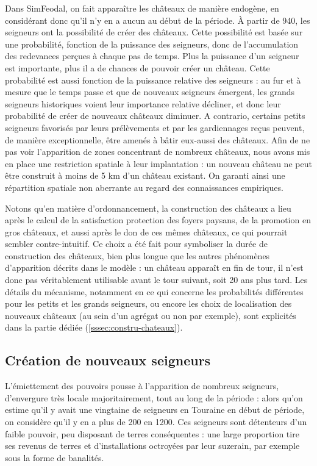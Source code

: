 Dans SimFeodal, on fait apparaître les châteaux de manière endogène, en considérant donc qu'il n'y en a aucun au début de la période.
À partir de 940, les seigneurs ont la possibilité de créer des châteaux.
Cette possibilité est basée sur une probabilité, fonction de la puissance des seigneurs, donc de l'accumulation des redevances perçues à chaque pas de temps.
Plus la puissance d'un seigneur est importante, plus il a de chances de pouvoir créer un château.
Cette probabilité est aussi fonction de la puissance relative des seigneurs : au fur et à mesure que le temps passe et que de nouveaux seigneurs émergent, les grands seigneurs historiques voient leur importance relative décliner, et donc leur probabilité de créer de nouveaux châteaux diminuer.
A contrario, certains petits seigneurs favorisés par leurs prélèvements et par les gardiennages reçus peuvent, de manière exceptionnelle, être amenés à bâtir eux-aussi des châteaux.
Afin de ne pas voir l'apparition de zones concentrant de nombreux châteaux, nous avons mis en place une restriction spatiale à leur implantation : un nouveau château ne peut être construit à moins de 5 km d'un château existant.
On garanti ainsi une répartition spatiale non aberrante au regard des connaissances empiriques.

Notons qu'en matière d'ordonnancement, la construction des châteaux a lieu après le calcul de la satisfaction protection des foyers paysans, de la promotion en gros châteaux, et aussi après le don de ces mêmes châteaux, ce qui pourrait sembler contre-intuitif.
Ce choix a été fait pour symboliser la durée de construction des châteaux, bien plus longue que les autres phénomènes d'apparition décrits dans le modèle : un château apparaît en fin de tour, il n'est donc pas véritablement utilisable avant le tour suivant, soit 20 ans plus tard.
Les détails du mécanisme, notamment en ce qui concerne les probabilités différentes pour les petits et les grands seigneurs, ou encore les choix de localisation des nouveaux châteaux (au sein d'un agrégat ou non par exemple), sont explicités dans la partie dédiée (\cref{sssec:constru-chateaux}).

\subsection{Création de nouveaux seigneurs}

L'émiettement des pouvoirs pousse à l'apparition de nombreux seigneurs, d'envergure très locale majoritairement, tout au long de la période : alors qu'on estime qu'il y avait une vingtaine de seigneurs en Touraine en début de période, on considère qu'il y en a plus de 200 en 1200.
Ces seigneurs sont détenteurs d'un faible pouvoir, peu disposant de terres conséquentes : une large proportion tire ses revenus de terres et d'installations octroyées par leur suzerain, par exemple sous la forme de banalités.

